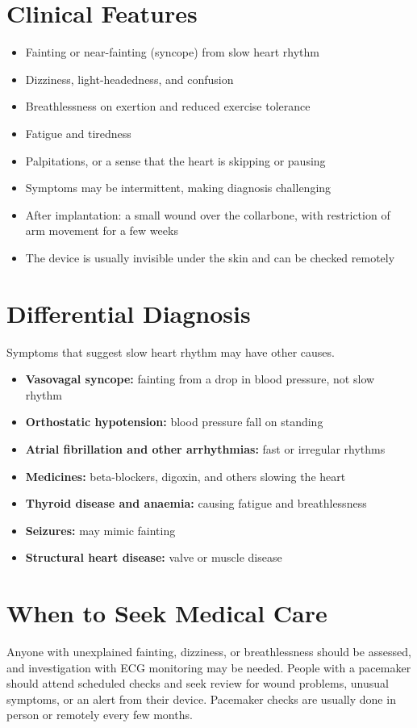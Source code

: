 \section*{Clinical Features}
\begin{itemize}
    \item Fainting or near-fainting (syncope) from slow heart rhythm
    \item Dizziness, light-headedness, and confusion
    \item Breathlessness on exertion and reduced exercise tolerance
    \item Fatigue and tiredness
    \item Palpitations, or a sense that the heart is skipping or pausing
    \item Symptoms may be intermittent, making diagnosis challenging
    \item After implantation: a small wound over the collarbone, with restriction of arm movement for a few weeks
    \item The device is usually invisible under the skin and can be checked remotely
\end{itemize}

\section*{Differential Diagnosis}
Symptoms that suggest slow heart rhythm may have other causes.
\begin{itemize}
    \item \textbf{Vasovagal syncope:} fainting from a drop in blood pressure, not slow rhythm
    \item \textbf{Orthostatic hypotension:} blood pressure fall on standing
    \item \textbf{Atrial fibrillation and other arrhythmias:} fast or irregular rhythms
    \item \textbf{Medicines:} beta-blockers, digoxin, and others slowing the heart
    \item \textbf{Thyroid disease and anaemia:} causing fatigue and breathlessness
    \item \textbf{Seizures:} may mimic fainting
    \item \textbf{Structural heart disease:} valve or muscle disease
\end{itemize}

\section*{When to Seek Medical Care}
Anyone with unexplained fainting, dizziness, or breathlessness should be assessed, and investigation with ECG monitoring may be needed. People with a pacemaker should attend scheduled checks and seek review for wound problems, unusual symptoms, or an alert from their device. Pacemaker checks are usually done in person or remotely every few months.

